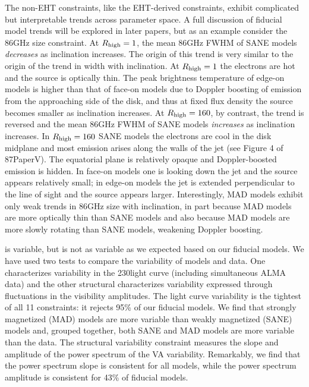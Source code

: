 The non-EHT constraints, like the EHT-derived constraints, exhibit  complicated but interpretable trends across parameter space. A full discussion of fiducial model trends will be explored in later papers, but as an example consider the 86GHz size constraint.  At $R_\mathrm{high} = 1$, the mean 86GHz FWHM of SANE models {\em decreases} as inclination increases.  The origin of this trend is very similar to the origin of the trend in \mring width with inclination.  At $R_\mathrm{high} = 1$ the electrons are hot and the source is optically thin. The peak brightness temperature of edge-on models is higher than that of face-on models due to Doppler boosting of emission from the approaching side of the disk, and thus at fixed flux density the source becomes smaller as inclination increases.  At $R_\mathrm{high} = 160$, by contrast, the trend is reversed and the mean 86GHz FWHM of SANE models {\em increases} as inclination increases.  In $R_\mathrm{high} = 160$ SANE models the electrons are cool in the disk midplane and most emission arises along the walls of the jet (see Figure 4 of \M87PaperV).  The equatorial plane is relatively opaque and Doppler-boosted emission is hidden. In face-on models one is looking down the jet and the source appears relatively small; in edge-on models the jet is extended perpendicular to the line of sight and the source appears larger.  Interestingly, MAD models exhibit only weak trends in 86GHz size with inclination, in part because MAD models are more optically thin than SANE models and also because MAD models are more slowly rotating than SANE models, weakening Doppler boosting.  

\sgra is variable, but is not as variable as we expected based on our fiducial models.
We have used two tests to compare the variability of models and data.
One characterizes variability in the 230\GHz light curve (including simultaneous ALMA data) and the other structural characterizes variability expressed through fluctuations in the visibility amplitudes.
The light curve variability is the tightest of all 11 constraints: it rejects 95\% of our fiducial models.
We find that strongly magnetized (MAD) models are more variable than weakly magnetized (SANE) models and, grouped together, both SANE and MAD models are more variable than the data.
The structural variability constraint measures the slope and amplitude of the power spectrum of the VA variability.
Remarkably, we find that the power spectrum slope is consistent for all models, while the power spectrum amplitude is consistent for 43\% of fiducial models.


